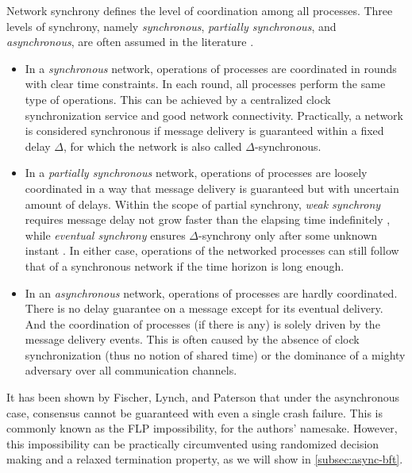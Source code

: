 Network synchrony defines the level of coordination among all processes. Three levels of synchrony, namely \emph{synchronous}, \emph{partially synchronous}, and \emph{asynchronous}, are often assumed in the literature .
\begin{itemize}
    \item In a \emph{synchronous} network, operations of processes are coordinated in rounds with clear time constraints. In each round, all processes perform the same type of operations. This can be achieved by a centralized clock synchronization service and good network connectivity. Practically, a network is considered synchronous if message delivery is guaranteed within a fixed delay $\Delta$, for which the network is also called $\Delta$-synchronous.
    \item In a \emph{partially synchronous} network, operations of processes are loosely coordinated in a way that message delivery is guaranteed but with uncertain amount of delays. Within the scope of partial synchrony, \textit{weak synchrony} requires message delay not grow faster than the elapsing time indefinitely , while \textit{eventual synchrony} ensures $\Delta$-synchrony only after some unknown instant . In either case, operations of the networked processes can still follow that of a synchronous network if the time horizon is long enough.
    \item In an \emph{asynchronous} network, operations of processes are hardly coordinated. There is no delay guarantee on a message except for its eventual delivery. And the coordination of processes (if there is any) is solely driven by the message delivery events. This is often caused by the absence of clock synchronization (thus no notion of shared time) or the dominance of a mighty adversary over all communication channels.
\end{itemize}
It has been shown by Fischer, Lynch, and Paterson  that under the asynchronous case, consensus cannot be guaranteed with even a single crash failure. This is commonly known as the FLP impossibility, for the authors' namesake. However, this impossibility can be practically circumvented using randomized decision making and a relaxed termination property, as we will show in \ref{subsec:async-bft}.


